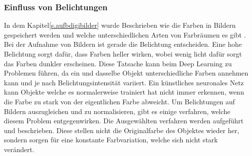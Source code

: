 \documentclass[a4paper,12pt,oneside]{article}
\begin{document}
\subsubsection{Einfluss von Belichtungen}\label{s.belichtung}
In dem Kapitel\ref{s.aufbdigibilder} wurde Beschrieben wie die Farben in Bildern gespeichert werden und welche unterschiedlichen Arten von Farbräumen es gibt \cite[41ff.]{burger2009digitale}. Bei der Aufnahme von Bildern ist gerade die Belichtung entscheiden. Eine hohe Belichtung sorgt dafür, dass Farben heller wirken, wobei wenig licht dafür sorgt das Farben dunkler erscheinen. Diese Tatsache kann beim Deep Learning zu Problemen führen, da ein und dasselbe Objekt unterschiedliche Farben annehmen kann und je nach Belichtungsintensität variiert. Ein künstliches neuronales Netz kann Objekte welche es normalerweise trainiert hat nicht immer erkennen, wenn die Farbe zu stark von der eigentlichen Farbe abweicht. Um Belichtungen auf Bildern auszugleichen und zu normalisieren, gibt es einige verfahren, welche diesem Problem entgegenwirken. Die Ausgewählten verfahren werden aufgeführt und beschrieben. Diese stellen nicht die Originalfarbe des Objektes wieder her, sondern sorgen für eine konstante Farbvariation, welche sich nicht stark verändert.
\end{document}
